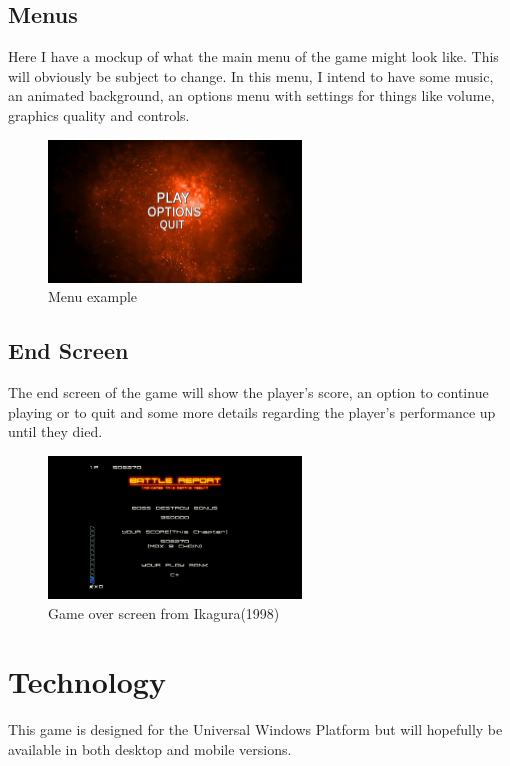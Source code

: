 \documentclass[a4paper]{scrreprt}
\begin{document}
\section{Menus}
Here I have a mockup of what the main menu of the game might look like. This will obviously be subject to change.
In this menu, I intend to have some music, an animated background, an options menu with settings for things like volume, graphics quality and controls.
\begin{figure}[h]
  \centering
  \includegraphics[width=0.6\textwidth]{SampleMenu}
  \caption{Menu example}
  \end{figure}

\clearpage
\section{End Screen}
The end screen of the game will show the player's score, an option to continue playing or to quit and some more details regarding the player's performance up until they died.
\begin{figure}[h]
  \centering
  \includegraphics[width=0.6\textwidth]{GameOver}
  \caption{Game over screen from Ikagura(1998)}
  \end{figure}


\chapter{Technology}
This game is designed for the Universal Windows Platform but will hopefully be available in both desktop and mobile versions.
\end{document}
